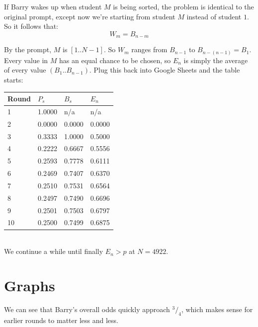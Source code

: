 \documentclass[10pt, letterpaper]{article}
\newcommand*\rfrac[2]{{}^{#1}\!/_{#2}}
\begin{document}
If Barry wakes up when student $M$ is being sorted, the problem is identical to the original prompt, except now we're starting from student $M$ instead of student $1$.
So it follows that:
\begin{equation*}
    W_m = B_{n-m}
\end{equation*}

By the prompt, $M$ is $[1..N-1]$. So $W_m$ ranges from $B_{n-1}$ to $B_{n-(n-1)} = B_1$.\\

Every value in $M$ has an equal chance to be chosen, so $E_n$ is simply the average of every value $(B_1..B_{n-1})$. Plug this back into Google Sheets and the table starts:\\

\begin{tabular}{l | l | l | l }
    Round   & $P_s$     & $B_s$     & $E_n$     \\ \hline
    1       & 1.0000    & n/a       & n/a       \\
    2       & 0.0000    & 0.0000    & 0.0000    \\
    3       & 0.3333    & 1.0000    & 0.5000    \\
    4       & 0.2222    & 0.6667    & 0.5556    \\
    5       & 0.2593    & 0.7778    & 0.6111    \\
    6       & 0.2469    & 0.7407    & 0.6370    \\
    7       & 0.2510    & 0.7531    & 0.6564    \\
    8       & 0.2497    & 0.7490    & 0.6696    \\
    9       & 0.2501    & 0.7503    & 0.6797    \\
    10      & 0.2500    & 0.7499    & 0.6875    \\
\end{tabular}\\

We continue a while until finally $E_n > p$ at $N = 4922$.

\pagebreak
\section*{Graphs}

We can see that Barry's overall odds quickly approach $\rfrac{3}{4}$, which makes sense for earlier rounds to matter less and less.
\end{document}

